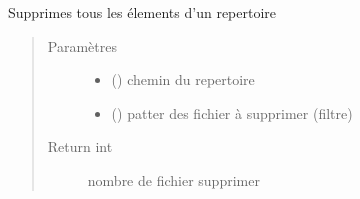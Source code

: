 \documentclass[letterpaper,10pt,french]{sphinxmanual}
\begin{document}
\begin{fulllineitems}
\label{\detokenize{modules/tools:toolbox.tools.clean_dir}}
Supprimes tous les élements d’un repertoire
\begin{quote}\begin{description}
\item[{Paramètres}] \leavevmode\begin{itemize}
\item {} 
 () \textendash{} chemin du repertoire

\item {} 
 () \textendash{} patter des fichier à supprimer (filtre)

\end{itemize}

\item[{Return int}] \leavevmode
nombre de fichier supprimer

\end{description}\end{quote}

\end{fulllineitems}

\end{document}
